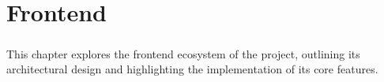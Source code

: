 \chapter{Frontend}\label{ch:frontend_web}

\paragraph{}This chapter explores the frontend ecosystem of the project, outlining its architectural design and highlighting the implementation of its core features.

